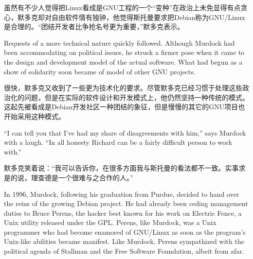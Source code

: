 \ifdefined\chs
虽然有不少人觉得把Linux看成是GNU工程的一个``变种''在政治上未免显得有点贪心，默多克却对自由软件情有独钟，他觉得斯托曼要求把Debian称为GNU/Linux是合理的。``团结开发者比争抢名号更为重要，''默多克表示。
\fi

\ifdefined\eng
Requests of a more technical nature quickly followed. Although Murdock had been accommodating on political issues, he struck a firmer pose when it came to the design and development model of the actual software. What had begun as a show of solidarity soon became of model of other GNU projects.
\fi

\ifdefined\chs
很快，默多克又收到了一些更为技术化的要求。尽管默多克已经习惯于处理这些政治化的问题，但是在实际的软件设计和开发模式上，他仍然坚持一种传统的模式。这起先被看成是Debian开发社区一种团结的象征，但是慢慢的其它的GNU项目也开始采用这种模式。
\fi

\ifdefined\eng
``I can tell you that I've had my share of disagreements with him,'' says Murdock with a laugh. ``In all honesty Richard can be a fairly difficult person to work with.'' %
\fi

\ifdefined\chs
默多克笑着说：``我可以告诉你，在很多方面我与斯托曼的看法都不一致。实事求是的说，理查德是一个很难与之合作的人。''
\fi

\ifdefined\eng
In 1996, Murdock, following his graduation from Purdue, decided to hand over the reins of the growing Debian project. He had already been ceding management duties to Bruce Perens, the hacker best known for his work on Electric Fence, a Unix utility released under the GPL. Perens, like Murdock, was a Unix programmer who had become enamored of GNU/Linux as soon as the program's Unix-like abilities became manifest. Like Murdock, Perens sympathized with the political agenda of Stallman and the Free Software Foundation, albeit from afar.
\fi


